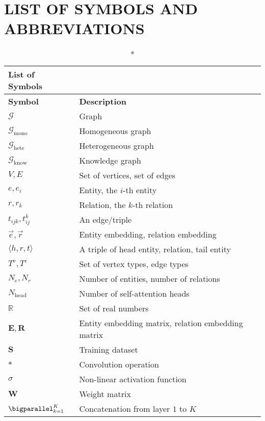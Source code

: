 \pagebreak
{}
{}
\section*{\textbf{ \Large LIST OF SYMBOLS AND ABBREVIATIONS}}

\begin{center}
	\begin{longtable}{|p{2cm}|p{14cm}|}
		\caption*{List of Symbols} \\
		\hline
		\textbf{Symbol} & \textbf{Description} \\
		\hline
		$\mathcal{G}$ & Graph \\
		\hline
		$\mathcal{G}_{\text{mono}}$ & Homogeneous graph \\
		\hline
		$\mathcal{G}_{\text{hete}}$ & Heterogeneous graph \\
		\hline
		$\mathcal{G}_{\text{know}}$ & Knowledge graph \\
		\hline
		$V, E$ & Set of vertices, set of edges \\
		\hline
		$e, e_i$ & Entity, the $i$-th entity \\
		\hline
		$r, r_k$ & Relation, the $k$-th relation \\
		\hline
		$t_{ijk}, t_{ij}^k$ & An edge/triple \\
		\hline
		$\overrightarrow{e}, \overrightarrow{r}$ & Entity embedding, relation embedding \\
		\hline
		$\langle h, r, t \rangle$ & A triple of head entity, relation, tail entity \\
		\hline
		$T^v, T^e$ & Set of vertex types, edge types \\
		\hline
		$N_e, N_r$ & Number of entities, number of relations \\
		\hline
		$N_{\text{head}}$ & Number of self-attention heads \\
		\hline
		$\mathbb{R}$ & Set of real numbers \\
		\hline
		$\mathbf{E}, \mathbf{R}$ & Entity embedding matrix, relation embedding matrix \\
		\hline
		$\mathbf{S}$ & Training dataset \\
		\hline
		$\ast$ & Convolution operation \\
		\hline
		$\sigma$ & Non-linear activation function \\
		\hline
		$\mathbf{W}$ & Weight matrix \\
		\hline
		$\bigparallel_{k=1}^{K}$ & Concatenation from layer $1$ to $K$ \\

\end{longtable}
\end{center}
